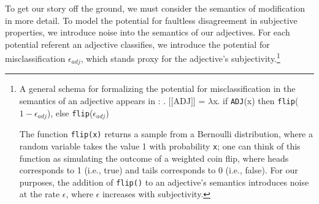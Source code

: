 \documentclass[preprint,authoryear]{elsarticle}\frenchspacing
\newcommand{\gcs}[1]{\textcolor{blue}{[gcs: #1]}}
\newcommand{\sem}[1]{\mbox{$[\![$#1$]\!]$}}
\newcommand{\lam}{\ensuremath{\lambda}}
\begin{document}
To get our story off the ground, we must consider the semantics of modification in more detail. To model the potential for faultless disagreement in subjective properties, we introduce noise into the semantics of our adjectives. 
%
%
For each potential referent an adjective classifies, we introduce the potential for misclassification $\epsilon_{adj}$, which stands proxy for the adjective's subjectivity.\footnote{A general schema for formalizing the potential for misclassification in the semantics of an adjective appears in \Next: 
	\ex. \sem{ADJ} = \lam x. if \texttt{ADJ}(x) then \texttt{flip}($1-\epsilon_{adj}$), else \texttt{flip}($\epsilon_{adj}$)
	
The function \texttt{flip(x)} returns a sample from a Bernoulli distribution, where a random variable takes the value 1 with probability \texttt{x}; one can think of this function as simulating the outcome of a weighted coin flip, where heads corresponds to 1 (i.e., true) and tails corresponds to 0 (i.e., false). For our purposes, the addition of \texttt{flip()} to an adjective's semantics introduces noise at the rate $\epsilon$, where $\epsilon$ increases with subjectivity.} 
%
\end{document}
